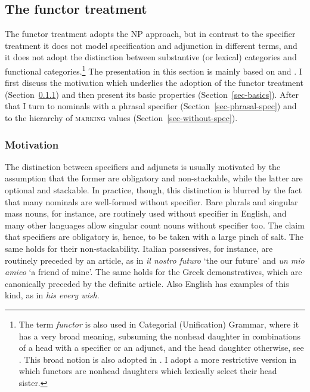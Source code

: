 \documentclass[output=paper
	        ,collection
	        ,collectionchapter
 	        ,biblatex
                ,babelshorthands
                ,newtxmath
                ,draftmode
                ,colorlinks, citecolor=brown
]{langscibook}
\begin{document}
\subsection{The functor treatment} 
\label{funct}


The functor treatment adopts the NP approach, but in contrast to the specifier treatment 
it does not model specification and adjunction in different terms, and it does not adopt 
the distinction between substantive (or lexical) categories and functional 
categories.\footnote{The term \emph{functor} is also used in Categorial (Unification) Grammar, 
where it has a very broad meaning, subsuming the nonhead daughter in combinations of a 
head with a specifier or an adjunct, and the head daughter otherwise, 
see \citet{Bouma88}. This broad notion is also adopted in 
\citet{Reape94}. I adopt a more restrictive version in which functors 
are nonhead daughters which lexically select their head sister.}  
The presentation in this section is mainly based on \citet{VanEynde06} 
and \citet{Allegranza06}. I first discuss the motivation which underlies the adoption 
of the functor treatment (Section~\ref{motiv}) and then present its basic
properties (Section~\ref{sec-basics}). After that I turn to nominals with a 
phrasal specifier (Section~\ref{sec-phrasal-spec}) 
and to the hierarchy of \textsc{marking} values (Section~\ref{sec-without-spec}).    


\subsubsection{Motivation} 
\label{motiv}


The distinction between specifiers and adjuncts is usually motivated by 
the assumption that the former are obligatory and non-stackable, while the latter  
are optional and stackable. In practice, though, this distinction 
is blurred by the fact that many nominals are well-formed without specifier.
Bare plurals and singular mass nouns, for instance, are routinely used without 
specifier in English, and many other languages allow singular count nouns without 
specifier too. The claim that specifiers are obligatory is, hence, to be taken 
with a large pinch of salt. The same holds for their non-stackability. 
Italian possessives, for instance, are routinely preceded by an article, as in 
\emph{il nostro futuro} `the our future' and \emph{un mio amico} `a friend of mine'.     
The same holds for the Greek demonstratives, which are canonically preceded by the 
definite article. Also English has examples of this kind, as in \emph{his every wish}.    
\end{document}
